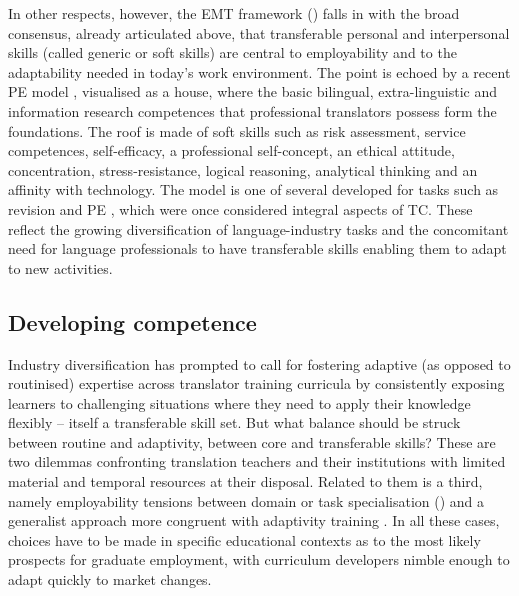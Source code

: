 \documentclass[output=paper]{langscibook}
\begin{document}
In other respects, however, the EMT framework (\citeyear[10]{emt_european_2022}) falls in with the broad consensus, already articulated above, that transferable personal and interpersonal skills (called generic or soft skills) are central to employability and to the adaptability needed in today’s work environment. The point is echoed by a recent PE model \citep[69--79]{nitzke_short_2021}, visualised as a house, where the basic bilingual, extra-linguistic and information research competences that professional translators possess form the foundations. The roof is made of soft skills such as risk assessment, service competences, self-efficacy, a professional self-concept, an ethical attitude, concentration, stress-resistance, logical reasoning, analytical thinking and an affinity with technology. The model is one of several developed for tasks such as revision and PE \citep{robert_translation_2023}, which were once considered integral aspects of TC. These reflect the growing diversification of language-industry tasks and the concomitant need for language professionals to have transferable skills enabling them to adapt to new activities. 

\subsection{Developing competence}

Industry diversification has prompted \citet{angelone_weaving_2023} to call for fostering adaptive (as opposed to routinised) expertise across translator training curricula by consistently exposing learners to challenging situations where they need to apply their knowledge flexibly – itself a transferable skill set. But what balance should be struck between routine and adaptivity, between core and transferable skills? These are two dilemmas confronting translation teachers and their institutions with limited material and temporal resources at their disposal. Related to them is a third, namely employability tensions between domain or task specialisation (\citealt{PrietoRamos2024_revisiting}) and a generalist approach more congruent with adaptivity training \citep{emt_european_2022}. In all these cases, choices have to be made in specific educational contexts as to the most likely prospects for graduate employment, with curriculum developers nimble enough to adapt quickly to market changes.
\end{document}
